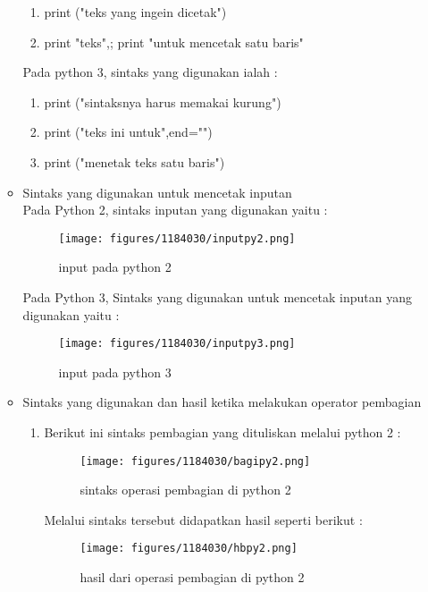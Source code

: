 \begin{enumerate}
\begin{itemize}
\begin{enumerate}
			\item print ("teks yang ingein dicetak")\\
			\item print "teks",; print "untuk mencetak satu baris"\\
			\end{enumerate}
		Pada python 3, sintaks yang digunakan ialah :\\
			\begin{enumerate}
			\item print ("sintaksnya harus memakai kurung")\\
			\item print ("teks ini untuk",end="")\\
			\item print ("menetak teks satu baris")\\
			\end{enumerate}
		\item Sintaks yang digunakan untuk mencetak inputan\\
		Pada Python 2, sintaks inputan yang digunakan  yaitu :\\
			\begin{figure}[H]
			\texttt{[image: figures/1184030/inputpy2.png]}
			\centering
			\caption{input pada python 2}
			\end{figure}
		Pada Python 3, Sintaks yang digunakan untuk mencetak inputan yang digunakan yaitu : 
		\hfill \break
			\begin{figure}[H]
			\texttt{[image: figures/1184030/inputpy3.png]}
			\centering
			\caption{input pada python 3}
			\end{figure}
		\item Sintaks yang digunakan dan hasil ketika melakukan operator pembagian\\
	\begin{enumerate}
	\item Berikut ini sintaks pembagian yang dituliskan melalui python 2 :
		\hfill \break
			\begin{figure}[H]
			\texttt{[image: figures/1184030/bagipy2.png]}
			\centering
			\caption{sintaks operasi pembagian di python 2}
			\end{figure}
		Melalui sintaks tersebut didapatkan hasil seperti berikut :
		\hfill \break
			\begin{figure}[H]
			\texttt{[image: figures/1184030/hbpy2.png]}
			\centering
			\caption{hasil dari operasi pembagian di python 2}
			\end{figure}

\end{enumerate}
\end{itemize}
\end{enumerate}
